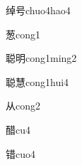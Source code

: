 \begin{verbete}[11;5]{绰号}{chuo4hao4}
\end{verbete}

\begin{verbete}[12]{葱}{cong1}
\end{verbete}

\begin{verbete}[15;8]{聪明}{cong1ming2}
\end{verbete}

\begin{verbete}[15;15]{聪慧}{cong1hui4}
\end{verbete}

\begin{verbete}[4]{从}{cong2}
\end{verbete}

\begin{verbete}[15]{醋}{cu4}
\end{verbete}

\begin{verbete}[13]{错}{cuo4}
\end{verbete}


